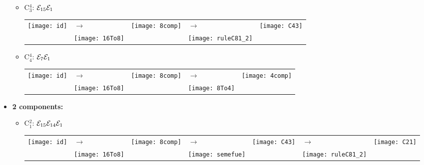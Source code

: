 \begin{itemize}
\begin{itemize}
\pagebreak
\item C$_3^4$: $\mathcal{E}_{15}\mathcal{E}_{1}$\newline
\begin{tabular}{m{2cm} m{2cm} m{2cm} m{2cm} m{2cm}}
\texttt{[image: id]}  
& \hspace{0.8cm}$\longrightarrow$ 
& \texttt{[image: 8comp]} 
& \hspace{0.8cm}$\longrightarrow$ 
& \texttt{[image: C43]}\\ 
 & \texttt{[image: 16To8]} &  
 & \texttt{[image: ruleC81\_2]} &\\ 
\end{tabular} 

\item C$_4^4$: $\mathcal{E}_7\mathcal{E}_1$\newline
\begin{tabular}{m{2cm} m{2cm} m{2cm} m{2cm} m{2cm}}
\texttt{[image: id]}  
& \hspace{0.8cm}$\longrightarrow$ 
& \texttt{[image: 8comp]} 
& \hspace{0.8cm}$\longrightarrow$ 
& \texttt{[image: 4comp]}\\ 
 & \texttt{[image: 16To8]} &  
 & \texttt{[image: 8To4]} &\\ 
\end{tabular} 
\end{itemize}


\item \textbf{2 components:}\newline
\begin{itemize}
\item C$_1^2$: $\mathcal{E}_{15}\mathcal{E}_{14}\mathcal{E}_1$\newline
\begin{tabular}{m{2cm} m{2cm} m{2cm} m{2cm} m{2cm} m{2cm} m{2cm}}
\texttt{[image: id]}  
& \hspace{0.8cm}$\longrightarrow$ 
& \texttt{[image: 8comp]} 
& \hspace{0.8cm}$\longrightarrow$ 
& \texttt{[image: C43]}
& \hspace{0.8cm}$\longrightarrow$ 
& \texttt{[image: C21]}\\ 
 & \texttt{[image: 16To8]} &  
 & \texttt{[image: semefue]} &
 & \texttt{[image: ruleC81\_2]} &\\ 
\end{tabular} 


\end{itemize}
\end{itemize}
